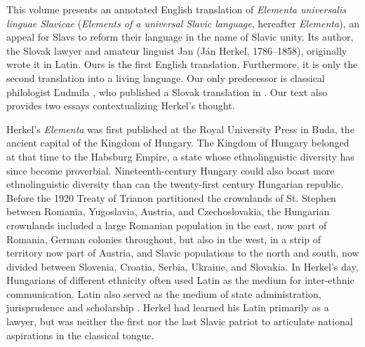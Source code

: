 \addchap{\lsPrefaceTitle}

This volume presents an annotated English translation of \textit{Elementa universalis linguae Slavicae} (\textit{Elements of a universal Slavic language}, hereafter \textit{Elementa}), an \citeyear{herkel_elementa_1826} appeal for Slavs to reform their language in the name of Slavic unity. Its author, the Slovak lawyer and amateur linguist Jan \citeauthor{herkel_elementa_1826} (Ján Herkeľ, 1786--1858), originally wrote it in Latin. Ours is the first English translation. Furthermore, it is only the second translation into a living language. Our only predecessor is classical philologist Ľudmila \citeauthor{herkel_jan_2009}, who published a Slovak translation in \citeyear{herkel_jan_2009}. Our text also provides two essays contextualizing Herkel’s thought.

Herkel’s \textit{Elementa} was first published at the Royal University Press in Buda, the ancient capital of the Kingdom of Hungary. The Kingdom of Hungary belonged at that time to the Habsburg Empire, a state whose ethnolinguistic diversity has since become proverbial. Nineteenth-century Hungary could also boast more ethnolinguistic diversity than can the twenty-first century Hungarian republic. Before the 1920 Treaty of Trianon partitioned the crownlands of St. Stephen between Romania, Yugoslavia, Austria, and Czechoslovakia, the Hungarian crownlands included a large Romanian population in the east, now part of Romania, German colonies throughout, but also in the west, in a strip of territory now part of Austria, and Slavic populations to the north and south, now divided between Slovenia, Croatia, Serbia, Ukraine, and Slovakia. In Herkel’s day, Hungarians of different ethnicity often used Latin as the medium for inter-ethnic communication. Latin also served as the medium of state administration, jurisprudence and scholarship \citep{almasi_latin_2015}. Herkel had learned his Latin primarily as a lawyer, but was neither the first nor the last Slavic patriot to articulate national aspirations in the classical tongue.

\label{sec:Preface Latin discussion}

